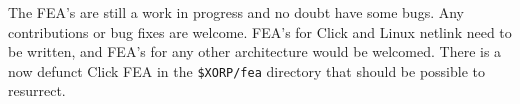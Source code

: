 \documentclass[11pt]{article}
\begin{document}
The FEA's are still a work in progress and no doubt have some bugs.
Any contributions or bug fixes are welcome.  FEA's for Click and Linux
netlink need to be written, and FEA's for any other architecture would
be welcomed.  There is a now defunct Click FEA in the {\tt \$XORP/fea}
directory that should be possible to resurrect.
\end{document}
